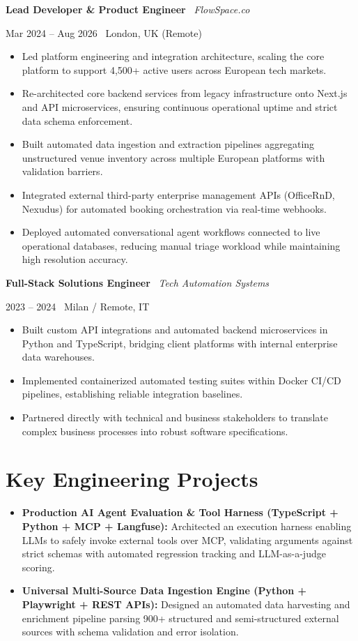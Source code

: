 \documentclass[a4paper,10pt]{article}
\newcommand{\role}[4]{%
  \vspace{2pt}\noindent
  \begin{minipage}[t]{0.70\textwidth}\raggedright\textbf{#1} \textbullet\ \textit{#3}\end{minipage}%
  \hfill
  \begin{minipage}[t]{0.28\textwidth}\raggedleft\footnotesize\color{gray}#2 \textbullet\ #4\end{minipage}%
  \vspace{1pt}%
}
\begin{document}
\vspace{3pt}
\role{Lead Developer \& Product Engineer}{Mar 2024 -- Aug 2026}{FlowSpace.co}{London, UK (Remote)}
\begin{itemize}
  \item Led platform engineering and integration architecture, scaling the core platform to support 4,500+ active users across European tech markets.
  \item Re-architected core backend services from legacy infrastructure onto Next.js and API microservices, ensuring continuous operational uptime and strict data schema enforcement.
  \item Built automated data ingestion and extraction pipelines aggregating unstructured venue inventory across multiple European platforms with validation barriers.
  \item Integrated external third-party enterprise management APIs (OfficeRnD, Nexudus) for automated booking orchestration via real-time webhooks.
  \item Deployed automated conversational agent workflows connected to live operational databases, reducing manual triage workload while maintaining high resolution accuracy.
\end{itemize}

\vspace{3pt}
\role{Full-Stack Solutions Engineer}{2023 -- 2024}{Tech Automation Systems}{Milan / Remote, IT}
\begin{itemize}
  \item Built custom API integrations and automated backend microservices in Python and TypeScript, bridging client platforms with internal enterprise data warehouses.
  \item Implemented containerized automated testing suites within Docker CI/CD pipelines, establishing reliable integration baselines.
  \item Partnered directly with technical and business stakeholders to translate complex business processes into robust software specifications.
\end{itemize}

\section{Key Engineering Projects}
\begin{itemize}
  \item \textbf{Production AI Agent Evaluation \& Tool Harness (TypeScript + Python + MCP + Langfuse):} Architected an execution harness enabling LLMs to safely invoke external tools over MCP, validating arguments against strict schemas with automated regression tracking and LLM-as-a-judge scoring.
  \item \textbf{Universal Multi-Source Data Ingestion Engine (Python + Playwright + REST APIs):} Designed an automated data harvesting and enrichment pipeline parsing 900+ structured and semi-structured external sources with schema validation and error isolation.
\end{itemize}
\end{document}
